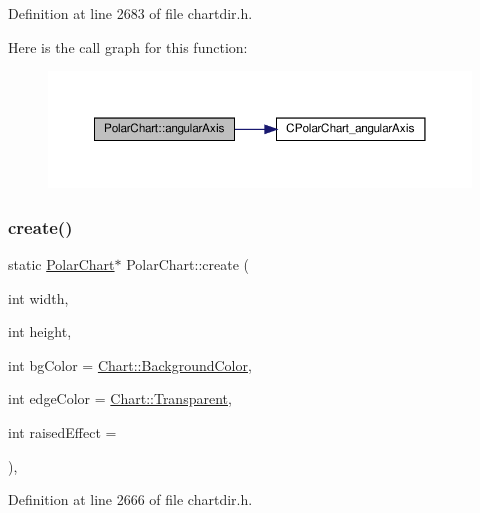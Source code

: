 Definition at line 2683 of file chartdir.\+h.

Here is the call graph for this function\+:
\nopagebreak
\begin{figure}[H]
\begin{center}
\leavevmode
\includegraphics[width=350pt]{class_polar_chart_ab8bf9e2fdc266ee0e8a5e878e3e80cde_cgraph}
\end{center}
\end{figure}
\mbox{\label{class_polar_chart_a0535130cd8a43ad6398f04acaf9d0614}} 
\subsubsection{\texorpdfstring{create()}{create()}}
{\footnotesize\ttfamily static \hyperlink{class_polar_chart}{Polar\+Chart}$\ast$ Polar\+Chart\+::create (\begin{DoxyParamCaption}\item[{int}]{width,  }\item[{int}]{height,  }\item[{int}]{bg\+Color = {\ttfamily \hyperlink{namespace_chart_abee0d882fdc9ad0b001245ad9fc64011a134193bde693b9d152d0c6dc59fa7d7f}{Chart\+::\+Background\+Color}},  }\item[{int}]{edge\+Color = {\ttfamily \hyperlink{namespace_chart_abee0d882fdc9ad0b001245ad9fc64011afc6811800a9e2582dac0157b6279f836}{Chart\+::\+Transparent}},  }\item[{int}]{raised\+Effect = {} }\end{DoxyParamCaption})\hspace{0.3cm}{\ttfamily [inline]}, {\ttfamily [static]}}



Definition at line 2666 of file chartdir.\+h.

\mbox{\label{class_polar_chart_a948b023559d129d515adf187526262eb}} 
